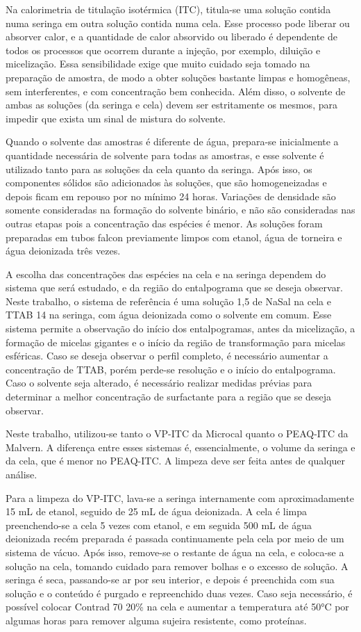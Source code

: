 		Na calorimetria de titulação isotérmica (ITC), titula-se uma solução contida numa seringa em outra solução contida numa cela. Esse processo pode liberar ou absorver calor, e a quantidade de calor absorvido ou liberado é dependente de todos os processos que ocorrem durante a injeção, por exemplo, diluição e micelização. Essa sensibilidade exige que muito cuidado seja tomado na preparação de amostra, de modo a obter soluções bastante limpas e homogêneas, sem interferentes, e com concentração bem conhecida. Além disso, o solvente de ambas as soluções (da seringa e cela) devem ser estritamente os mesmos, para impedir que exista um sinal de mistura do solvente.
		
		Quando o solvente das amostras é diferente de água, prepara-se inicialmente a quantidade necessária de solvente para todas as amostras, e esse solvente é utilizado tanto para as soluções da cela quanto da seringa. Após isso, os componentes sólidos são adicionados às soluções, que são homogeneizadas e depois ficam em repouso por no mínimo 24 horas. Variações de densidade são somente consideradas na formação do solvente binário, e não são consideradas nas outras etapas pois a concentração das espécies é menor. As soluções foram preparadas em tubos falcon previamente limpos com etanol, água de torneira e água deionizada três vezes.
		
		A escolha das concentrações das espécies na cela e na seringa dependem do sistema que será estudado, e da região do entalpograma que se deseja observar. Neste trabalho, o sistema de referência é uma solução 1,5 \mM{} de NaSal na cela e TTAB 14 \mM{} na seringa, com água deionizada como o solvente em comum. Esse sistema permite a observação do início dos entalpogramas, antes da micelização, a formação de micelas gigantes e o início da região de transformação para micelas esféricas. Caso se deseja observar o perfil completo, é necessário aumentar a concentração de TTAB, porém perde-se resolução e o início do entalpograma. Caso o solvente seja alterado, é necessário realizar medidas prévias para determinar a melhor concentração de surfactante para a região que se deseja observar.
		
		Neste trabalho, utilizou-se tanto o VP-ITC da Microcal quanto o PEAQ-ITC da Malvern. A diferença entre esses sistemas é, essencialmente, o volume da seringa e da cela, que é menor no PEAQ-ITC. A limpeza deve ser feita antes de qualquer análise.
		
		Para a limpeza do VP-ITC, lava-se a seringa internamente com aproximadamente 15 mL de etanol, seguido de 25 mL de água deionizada. A cela é limpa preenchendo-se a cela 5 vezes com etanol, e em seguida 500 mL de água deionizada recém preparada é passada continuamente pela cela por meio de um sistema de vácuo. Após isso, remove-se o restante de água na cela, e coloca-se a solução na cela, tomando cuidado para remover bolhas e o excesso de solução. A seringa é seca, passando-se ar por seu interior, e depois é preenchida com sua solução e o conteúdo é purgado e repreenchido duas vezes. Caso seja necessário, é possível colocar Contrad 70 20\% na cela e aumentar a temperatura até 50°C por algumas horas para remover alguma sujeira resistente, como proteínas.
		
